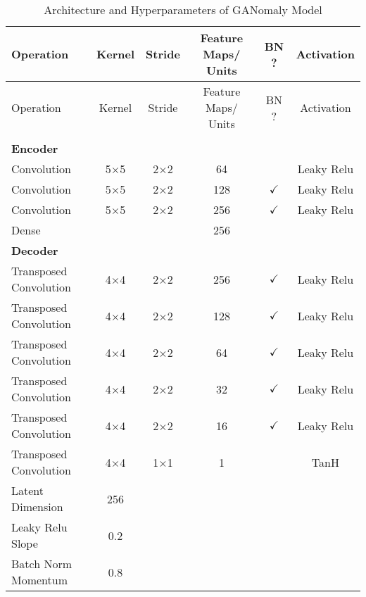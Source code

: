 \footnotesize
\begin{longtable}[c]{@{}lccccc@{}}
	\caption{Architecture and Hyperparameters of GANomaly Model}
	\label{tab:ganomaly_imp}\\
	\toprule
	Operation & Kernel & Stride & Feature Maps/ Units & BN ? & Activation \\* \midrule
	\endfirsthead
	\toprule
	Operation & Kernel & Stride & Feature Maps/ Units & BN ? & Activation \\* \midrule
	\endhead
	\bottomrule
	\endfoot
	\endlastfoot
	\multicolumn{6}{l}{\textbf{Generator}} \\
	\multicolumn{6}{l}{\textbf{Encoder}} \\
	Convolution & \multicolumn{1}{c}{5$\times$5} & 2$\times$2 & 64 &  & Leaky Relu \\
	Convolution & \multicolumn{1}{c}{5$\times$5} & 2$\times$2 & 128 & $\checkmark$ & Leaky Relu \\
	Convolution & \multicolumn{1}{c}{5$\times$5} & 2$\times$2 & 256 & $\checkmark$ & Leaky Relu \\
	Dense & \multicolumn{1}{c}{} &  & 256 &  &  \\ 
	\multicolumn{6}{l}{\textbf{Decoder}} \\
	Transposed Convolution & \multicolumn{1}{c}{4$\times$4} & 2$\times$2 & 256 & $\checkmark$ & Leaky Relu \\
	Transposed Convolution & \multicolumn{1}{c}{4$\times$4} & 2$\times$2 & 128 & $\checkmark$ & Leaky Relu \\
	Transposed Convolution & \multicolumn{1}{c}{4$\times$4} & 2$\times$2 & 64 & $\checkmark$ & Leaky Relu \\
	Transposed Convolution & \multicolumn{1}{c}{4$\times$4} & 2$\times$2 & 32 & $\checkmark$ & Leaky Relu \\
	Transposed Convolution & \multicolumn{1}{c}{4$\times$4} & 2$\times$2 & 16 & $\checkmark$ & Leaky Relu \\
	Transposed Convolution & \multicolumn{1}{c}{4$\times$4} & 1$\times$1 & 1 &  & TanH \\ \hline
	Latent Dimension & 256 & \multicolumn{1}{l}{} & \multicolumn{1}{l}{} & \multicolumn{1}{l}{} & \multicolumn{1}{l}{} \\
	Leaky Relu Slope & 0.2 & \multicolumn{1}{l}{} & \multicolumn{1}{l}{} & \multicolumn{1}{l}{} & \multicolumn{1}{l}{} \\
	Batch Norm Momentum & 0.8 & \multicolumn{1}{l}{} & \multicolumn{1}{l}{} & \multicolumn{1}{l}{} & \multicolumn{1}{l}{} \\

\end{longtable}
